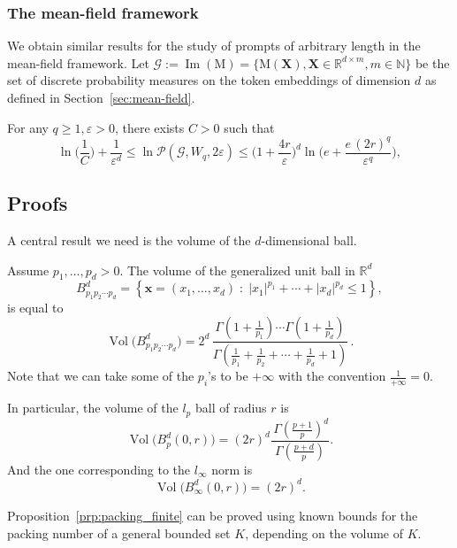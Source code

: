\subsubsection*{The mean-field framework}

We obtain similar results for the study of prompts of arbitrary length in the mean-field framework. Let $\mathcal G:=\operatorname{Im}(\mathrm{M})=\{\mathrm M(\mathbf X),\mathbf X\in\mathbb R^{d\times m},m\in\mathbb N\}$ be the set of discrete probability measures on the token embeddings of dimension $d$ as defined in Section~\ref{sec:mean-field}.

\begin{proposition}\label{prp:packing_infinite}
    For any $q\ge1,\varepsilon>0$, there exists $C>0$ such that
    \[\operatorname{ln}\Big(\frac1C\Big)+\frac1{\varepsilon^d}\le\operatorname{ln} \mathcal P(\mathcal{G}, W_q,2\varepsilon) \leq \Big(1+\frac{4r}\varepsilon\Big)^d \operatorname{ln}\Big(e + \frac{e \, (2r)^q}{\varepsilon^q}\Big),\]
\end{proposition}

\subsection{Proofs}

A central result we need is the volume of the $d$-dimensional ball.

\begin{lemma}\label{lem:Wang}
Assume $p_1, \ldots, p_d > 0$. 
The volume of the generalized unit ball in $\mathbb{R}^d$
\[
B_{p_1 p_2 \cdots p_d}^d
= \left\{ \mathbf{x} = (x_1, \ldots, x_d) \;:\;
|x_1|^{p_1} + \cdots + |x_d|^{p_d} \leq 1 \right\},
\]  is equal to
\[
\operatorname{Vol}\big(B_{p_1 p_2 \cdots p_d}^d\big)=2^d \, \frac{\Gamma\!\left(1+\tfrac{1}{p_1}\right)\cdots \Gamma\!\left(1+\tfrac{1}{p_d}\right)}
{\Gamma\!\left(\tfrac{1}{p_1} + \tfrac{1}{p_2} + \cdots + \tfrac{1}{p_d} + 1\right)} \, .
\]
Note that we can take some of the $p_i$'s to be $+\infty$ with the convention $\frac1{+\infty}=0$.

In particular, the volume of the $l_p$ ball of radius $r$ is
\[
\operatorname{Vol}\!\big(B_p^d(0,r)\big)
= (2r)^d\frac{ \, \Gamma\!\left(\tfrac{p+1}{p}\right)^d}{\Gamma\!\left(\tfrac{p+d}{p}\right)}.
\]
And the one corresponding to the $l_\infty$ norm is
\[
\operatorname{Vol}\!\big(B_\infty^d(0,r)\big)
= (2r)^d.
\]
\end{lemma}

Proposition~\ref{prp:packing_finite} can be proved using known bounds for the packing number of a general bounded set $K$, depending on the volume of $K$.

